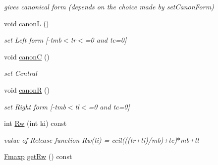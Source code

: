 \begin{DoxyCompactItemize}
\begin{DoxyCompactList}\small\item\em gives canonical form (depends on the choice made by set\+Canon\+Form) \end{DoxyCompactList}\item 
\mbox{\label{classetvo_i_i_1_1d_dd_a77c3fdcf1470c5fe606df6a8cd04864d}} 
void \mbox{\hyperlink{classetvo_i_i_1_1d_dd_a77c3fdcf1470c5fe606df6a8cd04864d}{canonL}} ()
\begin{DoxyCompactList}\small\item\em set Left form \mbox{[}-\/tmb$<$tr$<$=0 and tc=0\mbox{]} \end{DoxyCompactList}\item 
\mbox{\label{classetvo_i_i_1_1d_dd_ad19305ace696b7eaf48adb0be90f5439}} 
void \mbox{\hyperlink{classetvo_i_i_1_1d_dd_ad19305ace696b7eaf48adb0be90f5439}{canonC}} ()
\begin{DoxyCompactList}\small\item\em set Central \end{DoxyCompactList}\item 
\mbox{\label{classetvo_i_i_1_1d_dd_adc0dd6dcd40871435394df1a02b6e479}} 
void \mbox{\hyperlink{classetvo_i_i_1_1d_dd_adc0dd6dcd40871435394df1a02b6e479}{canonR}} ()
\begin{DoxyCompactList}\small\item\em set Right form \mbox{[}-\/tmb$<$tl$<$=0 and tc=0\mbox{]} \end{DoxyCompactList}\item 
\mbox{\label{classetvo_i_i_1_1d_dd_a22c7606ff8da7b112e0476a11d565912}} 
int \mbox{\hyperlink{classetvo_i_i_1_1d_dd_a22c7606ff8da7b112e0476a11d565912}{Rw}} (int ki) const
\begin{DoxyCompactList}\small\item\em value of Release function Rw(ti) = ceil(((tr+ti)/mb)+tc)$\ast$mb+tl \end{DoxyCompactList}\item 
\mbox{\label{classetvo_i_i_1_1d_dd_afeb268909ec6a3841417b10f26ab20d1}} 
\mbox{\hyperlink{classetvo_i_i_1_1_fmaxp}{Fmaxp}} \mbox{\hyperlink{classetvo_i_i_1_1d_dd_afeb268909ec6a3841417b10f26ab20d1}{get\+Rw}} () const

\end{DoxyCompactItemize}
